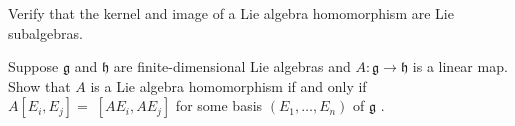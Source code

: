 \begin{exercise}
\label{exer:8-34}
\mathlibok
{}
Verify that the kernel and image of a Lie algebra homomorphism are Lie subalgebras.
\end{exercise}

\begin{exercise}
\label{exer:8-35}
\leanok
{}
Suppose $\mathfrak{g}$ and $\mathfrak{h}$ are finite-dimensional Lie algebras and $A : \mathfrak{g} \rightarrow  \mathfrak{h}$ is a linear map. Show that $A$ is a Lie algebra homomorphism if and only if $A\left\lbrack  {{E}_{i},{E}_{j}}\right\rbrack   = \; \left\lbrack  {A{E}_{i}, A{E}_{j}}\right\rbrack$ for some basis $\left( {{E}_{1},\ldots ,{E}_{n}}\right)$ of $\mathfrak{g}$ .
\end{exercise}

